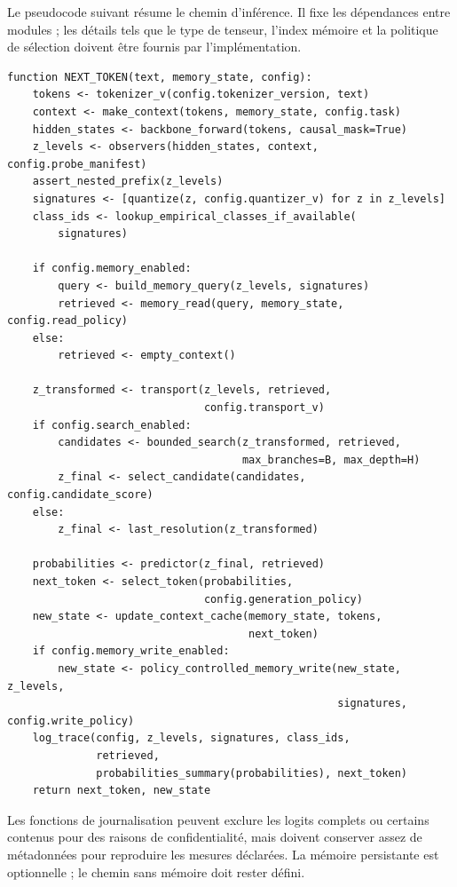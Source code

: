 \documentclass[11pt,a4paper]{article}
\theoremstyle{remark}
\begin{document}
Le pseudocode suivant résume le chemin d'inférence. Il fixe les dépendances entre modules ; les détails tels que le type de tenseur, l'index mémoire et la politique de sélection doivent être fournis par l'implémentation.
\small
\begin{verbatim}
function NEXT_TOKEN(text, memory_state, config):
    tokens <- tokenizer_v(config.tokenizer_version, text)
    context <- make_context(tokens, memory_state, config.task)
    hidden_states <- backbone_forward(tokens, causal_mask=True)
    z_levels <- observers(hidden_states, context, config.probe_manifest)
    assert_nested_prefix(z_levels)
    signatures <- [quantize(z, config.quantizer_v) for z in z_levels]
    class_ids <- lookup_empirical_classes_if_available(
        signatures)

    if config.memory_enabled:
        query <- build_memory_query(z_levels, signatures)
        retrieved <- memory_read(query, memory_state, config.read_policy)
    else:
        retrieved <- empty_context()

    z_transformed <- transport(z_levels, retrieved,
                               config.transport_v)
    if config.search_enabled:
        candidates <- bounded_search(z_transformed, retrieved,
                                     max_branches=B, max_depth=H)
        z_final <- select_candidate(candidates, config.candidate_score)
    else:
        z_final <- last_resolution(z_transformed)

    probabilities <- predictor(z_final, retrieved)
    next_token <- select_token(probabilities,
                               config.generation_policy)
    new_state <- update_context_cache(memory_state, tokens,
                                      next_token)
    if config.memory_write_enabled:
        new_state <- policy_controlled_memory_write(new_state, z_levels,
                                                    signatures, config.write_policy)
    log_trace(config, z_levels, signatures, class_ids,
              retrieved,
              probabilities_summary(probabilities), next_token)
    return next_token, new_state
\end{verbatim}
\normalsize

Les fonctions de journalisation peuvent exclure les logits complets ou certains contenus pour des raisons de confidentialité, mais doivent conserver assez de métadonnées pour reproduire les mesures déclarées. La mémoire persistante est optionnelle ; le chemin sans mémoire doit rester défini.

\end{document}
